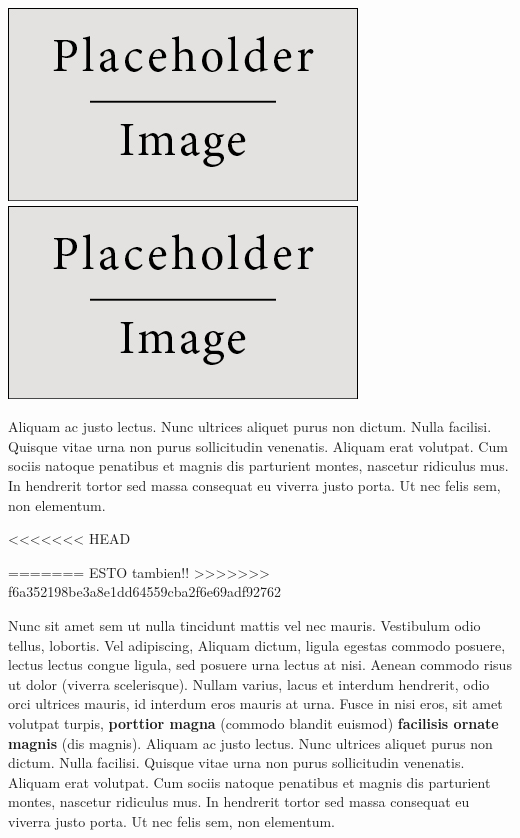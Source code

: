 \documentclass[a0paper,portrait]{baposter}
\begin{document}
\begin{poster}
{\begin{center}
\includegraphics[width=0.49\linewidth]{placeholder}
\includegraphics[width=0.49\linewidth]{placeholder}
\end{center}


Aliquam ac justo lectus. Nunc ultrices aliquet purus non dictum. Nulla facilisi. Quisque vitae urna non purus sollicitudin venenatis. Aliquam erat volutpat. Cum sociis natoque penatibus et magnis dis parturient montes, nascetur ridiculus mus. In hendrerit tortor sed massa consequat eu viverra justo porta. Ut nec felis sem, non elementum.


<<<<<<< HEAD

=======
ESTO tambien!!
>>>>>>> f6a352198be3a8e1dd64559cba2f6e69adf92762


Nunc sit amet sem ut nulla tincidunt mattis vel nec mauris. Vestibulum odio tellus, lobortis. Vel adipiscing, Aliquam dictum, ligula egestas commodo posuere, lectus lectus congue ligula, sed posuere urna lectus at nisi. Aenean commodo risus ut dolor (viverra scelerisque). Nullam varius, lacus et interdum hendrerit, odio orci ultrices mauris, id interdum eros mauris at urna. Fusce in nisi eros, sit amet volutpat turpis, \textbf{porttior magna} (commodo blandit euismod) \textbf{facilisis ornate magnis} (dis magnis). Aliquam ac justo lectus. Nunc ultrices aliquet purus non dictum. Nulla facilisi. Quisque vitae urna non purus sollicitudin venenatis. Aliquam erat volutpat. Cum sociis natoque penatibus et magnis dis parturient montes, nascetur ridiculus mus. In hendrerit tortor sed massa consequat eu viverra justo porta. Ut nec felis sem, non elementum.
}


\end{poster}
\end{document}
